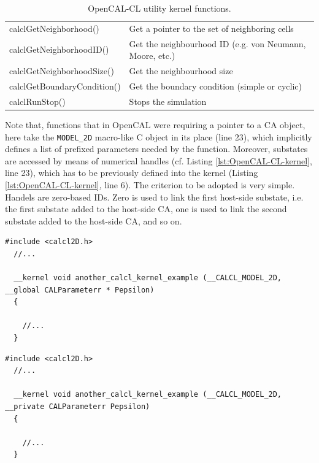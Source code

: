 \begin{table}
\begin{footnotesize}
\begin{tabular}{l|l}
    calclGetNeighborhood()         & Get a pointer to the set of neighboring cells \\
    calclGetNeighborhoodID()       & Get the neighbourhood ID (e.g. von Neumann, Moore, etc.) \\
    calclGetNeighborhoodSize()     & Get the neighbourhood size \\
    calclGetBoundaryCondition()    & Get the boundary condition (simple or cyclic) \\
    calclRunStop()                 & Stops the simulation \\
    \hline
    \end{tabular}
    \end{footnotesize}
  \caption{OpenCAL-CL utility kernel functions.}
  \label{tab:kernel-utility-function}
\end{table} 

Note that, functions that in OpenCAL were requiring a pointer to a CA
object, here take the \verb'MODEL_2D' macro-like C object in its place
(line 23), which implicitly defines a list of prefixed parameters
needed by the function. Moreover, substates are accessed by means of
numerical handles (cf. Listing \ref{lst:OpenCAL-CL-kernel}, line 23),
which has to be previously defined into the kernel (Listing
\ref{lst:OpenCAL-CL-kernel}, line 6). The criterion to be adopted is
very simple. Handels are zero-based IDs. Zero is used to link the
first host-side substate, i.e. the first substate added to the
host-side CA, one is used to link the second substate added to the
host-side CA, and so on.

\begin{lstlisting}[float,floatplacement=H, label=lst:Another-OpenCAL-CL-kernel, caption={Another example of OpenCAL-CL kernel, with an additional global parameter.}] 
  #include <calcl2D.h>
  //...
    
  __kernel void another_calcl_kernel_example (__CALCL_MODEL_2D, __global CALParameterr * Pepsilon)
  {
    
    //...
  }
\end{lstlisting}

\begin{lstlisting}[float,floatplacement=H, label=lst:kernel-private-parameter, caption={Another example of OpenCAL-CL kernel, with an additional private parameter.}] 
  #include <calcl2D.h>
  //...
    
  __kernel void another_calcl_kernel_example (__CALCL_MODEL_2D, __private CALParameterr Pepsilon)
  {
    
    //...
  }
\end{lstlisting}



